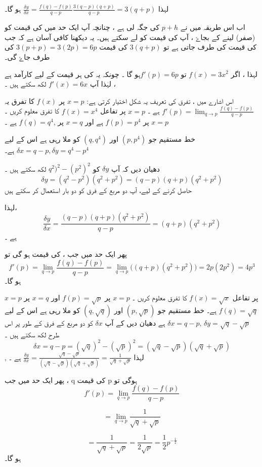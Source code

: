 لہذا  \(\frac{\delta y}{\delta x}=\frac{f(q)-f(p)}{q-p}\frac{3(q-p)(q+p)}{q-p}=3(q+p)\) ہو گا۔ 
  
اب اس طریقہ میں نے \( p+h  \) کی جگہ لی ہے ،  چنانچہ آپ ایک حد میں  کی قیمت کو  (صفر) لینے کے بجاۓ ، آپ   کی قیمت کو  لے سکتے ہیں۔ 
یہ دیکھنا کافی آسان ہے کہ جب   کی قیمت کی طرف جاتی ہے تو  
\(3(q+p)\) کی قیمت \(3(p+p)=3(2p)=6p\)
 کی طرف جاۓ گی۔


لہذا ، اگر \( f(x)=3x^2  \) تو  \(f'(p)=6p\)ہو گا ۔  چونکہ یہ کی ہر قیمت کے لیے کارآمد ہے ، لہٰذا آپ \(f'(x)=6x\) لکھ سکتے ہیں ۔ 

اس اشارے میں ، تفرق کی تعریف یہ شکل اختیار کرتی ہے:
\(x=p\) پر \(f(x)\) کا تفرق یہ \(f'(p)=\lim_{q \to p}\frac{f(q)-f(p)}{q-p}\) ہے ۔ 
 \(x=p\) پر تفاعل \(f(x)=x^4\) کا تفرق معلوم کریں ۔ 
\(x=p\) پر \(f(p)=p^4\) ہے اور \(x=q\) پر ,\(f(q)=q^4\) ہے ۔ 
  
خط مستقیم جو \((p,p^4)\) اور \((q,q^4)\) کو ملا رہی ہے اس کے لیے \(\delta x=q-p, \delta y= q^4-p^4\) ہے۔ 


دھیان دیں کہ آپ \(\delta y\) کو \(q^2)^2 -(p^2)^2 \) لکھ سکتے ہیں ۔  \[\delta y= (q^2 -p^2)(q^2+p^2)=(q-p)(q+p)(q^2+p^2)\] حاصل کرنے کے لیے،  آپ  دو مربع کے فرق کو دو بار استعمال کر سکتے ہیں  

لہذا، \[\frac{\delta y}{\delta x}=\frac{(q-p)(q+p)(q^2+p^2)}{q-p}=(q+p)(q^2 +p^2)\] ہے ۔

پھر ایک حد میں جب ،  کی قیمت  ہو  گی تو \[f'(p)=\lim_{q \to p}\frac{f(q)-f(p)}{q-p}=\lim_{q \to p}\big((q+p)(q^2 +p^2)\big)=2p(2p^2)=4p^3\] ہو گا۔ 


\(x=p\) پر تفاعل \(f(x)=\sqrt{x}\) کا تفرق معلوم کریں ۔
\(x=p\) پر \(f(p)=\sqrt{p}\) اور \(x=q\) پر \(f(q)=\sqrt{q}\)   ہے۔
خط مستقیم جو \((p,\sqrt{p})\) اور \((q,\sqrt{q})\)  کو ملا رہی ہے  اس کے لیے   \(\delta x=q-p, \, \delta y=\sqrt{q}-\sqrt{p}\) ہے  
دھیان دیں کے آپ \(\delta x\) کو  دو مربع کے فرق کے طور پر اس طرح لکھ سکتے ہیں ۔ \[\delta x=q-p=(\sqrt{q})^2-(\sqrt{p})^2 = (\sqrt{q} - \sqrt{p})(\sqrt{q} + \sqrt{p})\]
,%
لہذا \(\frac{\delta y}{\delta x}= \frac{\sqrt{q}-\sqrt{p}}{(\sqrt{q}-\sqrt{p})(\sqrt{q}+\sqrt{p})}=\frac{1}{\sqrt{q}+\sqrt{p}}\) ہے ۔

پھر ایک حد میں جب ، q کی قیمت p ہوگی تو \[f'(p)=\lim_{q \to p}\frac{f(q)-f(p)}{q-p}\] 

\[=\lim_{q \to p}\frac{1}{\sqrt{q}+\sqrt{p}}\]


\[=\frac{1}{\sqrt{q}+\sqrt{p}}=\frac{1}{2\sqrt{p}}=\frac{1}{2}p^{-\frac{1}{2}}\] ہو گا۔

